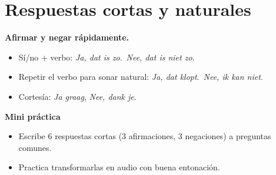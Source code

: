 \section{Respuestas cortas y naturales}
\textbf{Afirmar y negar rápidamente.}
\begin{itemize}[leftmargin=*]
  \item Sí/no + verbo: \textit{Ja, dat is zo}.\ \textit{Nee, dat is niet zo}.
  \item Repetir el verbo para sonar natural: \textit{Ja, dat klopt}.\ \textit{Nee, ik kan niet}.
  \item Cortesía: \textit{Ja graag}, \textit{Nee, dank je}.
\end{itemize}

\textbf{Mini práctica}
\begin{itemize}[leftmargin=*]
  \item Escribe 6 respuestas cortas (3 afirmaciones, 3 negaciones) a preguntas comunes.
  \item Practica transformarlas en audio con buena entonación.
\end{itemize}
